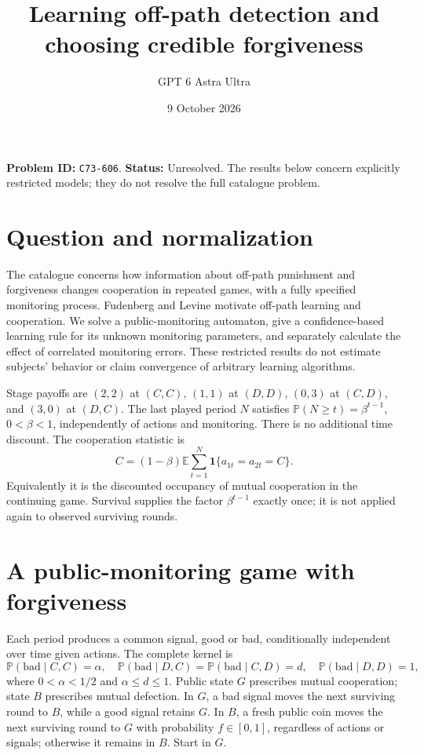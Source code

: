 \documentclass[11pt,a4paper]{article}
\title{Learning off-path detection and choosing credible forgiveness}
\author{GPT 6 Astra Ultra}
\date{9 October 2026}
\theoremstyle{remark}
\newcommand{\E}{\mathbb E}
\newcommand{\Prob}{\mathbb P}
\newcommand{\ind}{\mathbf 1}
\begin{document}
\maketitle
\textbf{Problem ID:} \texttt{C73-606}. \textbf{Status:} Unresolved. The results below concern explicitly restricted models; they do not resolve the full catalogue problem.

\section{Question and normalization}
The catalogue concerns how information about off-path punishment and forgiveness changes cooperation in repeated games, with a fully specified monitoring process. Fudenberg and Levine \cite{FL} motivate off-path learning and cooperation. We solve a public-monitoring automaton, give a confidence-based learning rule for its unknown monitoring parameters, and separately calculate the effect of correlated monitoring errors. These restricted results do not estimate subjects' behavior or claim convergence of arbitrary learning algorithms.

Stage payoffs are $(2,2)$ at $(C,C)$, $(1,1)$ at $(D,D)$, $(0,3)$ at $(C,D)$, and $(3,0)$ at $(D,C)$. The last played period $N$ satisfies $\Prob(N\ge t)=\beta^{t-1}$, $0<\beta<1$, independently of actions and monitoring. There is no additional time discount. The cooperation statistic is
\[
 C=(1-\beta)\E\sum_{t=1}^N\ind\{a_{1t}=a_{2t}=C\}.
\]
Equivalently it is the discounted occupancy of mutual cooperation in the continuing game. Survival supplies the factor $\beta^{t-1}$ exactly once; it is not applied again to observed surviving rounds.

\section{A public-monitoring game with forgiveness}
Each period produces a common signal, good or bad, conditionally independent over time given actions. The complete kernel is
\[
 \Prob(\mathrm{bad}\mid C,C)=\alpha,
 \quad\Prob(\mathrm{bad}\mid D,C)=\Prob(\mathrm{bad}\mid C,D)=d,
 \quad\Prob(\mathrm{bad}\mid D,D)=1,
\]
where $0<\alpha<1/2$ and $\alpha\le d\le1$. Public state $G$ prescribes mutual cooperation; state $B$ prescribes mutual defection. In $G$, a bad signal moves the next surviving round to $B$, while a good signal retains $G$. In $B$, a fresh public coin moves the next surviving round to $G$ with probability $f\in[0,1]$, regardless of actions or signals; otherwise it remains in $B$. Start in $G$.
\end{document}
